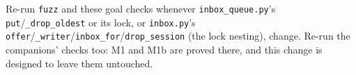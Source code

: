 \documentclass[a4paper,10pt,fleqn]{article}
\begin{document}
Re-run \texttt{fuzz} and these goal checks whenever \texttt{inbox\_queue.py}'s
\texttt{put}/\texttt{\_drop\_oldest} or its lock, or \texttt{inbox.py}'s
\texttt{offer}/\texttt{\_writer}/\texttt{inbox\_for}/\texttt{drop\_session}
(the lock nesting), change. Re-run the companions' checks too: M1 and M1b are
proved there, and this change is designed to leave them untouched.
\end{document}

